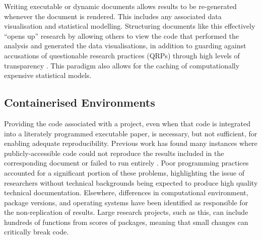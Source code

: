 \documentclass[../main.tex]{subfiles}
\begin{document}
Writing executable or dynamic documents allows results to be
re-generated whenever the document is rendered. This includes any
associated data visualisation and statistical modelling. Structuring
documents like this effectively ``opens up'' research by allowing others
to view the code that performed the analysis and generated the data
visualisations, in addition to guarding against accusations of
questionable research practices (QRPs) through high levels of
transparency \cite{holmes_2021}. This paradigm also allows for the
caching of computationally expensive statistical models.

\subsection{Containerised
Environments}\label{containerised-environments}

Providing the code associated with a project, even when that code is
integrated into a literately programmed executable paper, is necessary,
but not sufficient, for enabling adequate reproducibility. Previous work
has found many instances where publicly-accessible code could not
reproduce the results included in the corresponding document or failed
to run entirely \cite{collberg_2016, trisovic_2022, samuel_2024}. Poor
programming practices accounted for a significant portion of these
problems, highlighting the issue of researchers without technical
backgrounds being expected to produce high quality technical
documentation. Elsewhere, differences in computational environment,
package versions, and operating systems have been identified as
responsible for the non-replication of results. Large research projects,
such as this, can include hundreds of functions from scores of packages,
meaning that small changes can critically break code.
\end{document}

